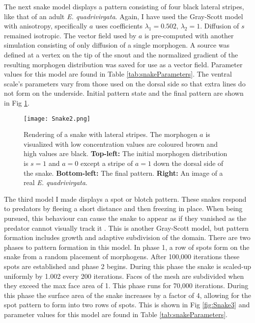 The next snake model displays a pattern consisting of four black lateral stripes, like that of an adult \textit{E. quadrivirgata}. Again, I have used the Gray-Scott model with anisotropy, specifically $a$ uses coefficients $\lambda_{1}=0.502$, $\lambda_{2}=1$. Diffusion of $s$ remained isotropic. The vector field used by $a$ is pre-computed with another simulation consisting of only diffusion of a single morphogen. A source was defined at a vertex on the tip of the snout and the normalized gradient of the resulting morphogen distribution was saved for use as a vector field. Parameter values for this model are found in Table \ref{tab:snakeParameters}. The ventral scale's parameters vary from those used on the dorsal side so that extra lines do not form on the underside. Initial pattern state and the final pattern are shown in Fig \ref{fig:Snake2}.

\begin{figure}[ht]
	\centering
	\texttt{[image: Snake2.png]}
	\caption{Rendering of a snake with lateral stripes. The morphogen $a$ is visualized with low concentration values are coloured brown and high values are black. \textbf{Top-left:} The initial morphogen distribution is $s=1$ and $a=0$ except a stripe of $a=1$ down the dorsal side of the snake. \textbf{Bottom-left:} The final pattern. \textbf{Right:} An image of a real \textit{E. quadrivirgata}.}
	\label{fig:Snake2}
\end{figure}

The third model I made displays a spot or blotch pattern. These snakes respond to predators by fleeing a short distance and then freezing in place. When being pursued, this behaviour can cause the snake to appear as if they vanished as the predator cannot visually track it \citep{lillywhite2014}. This is another Gray-Scott model, but pattern formation includes growth and adaptive subdivision of the domain. There are two phases to pattern formation in this model. In phase 1, a row of spots form on the snake from a random placement of morphogens. After 100,000 iterations these spots are established and phase 2 begins. During this phase the snake is scaled-up uniformly by 1.002 every 200 iterations. Faces of the mesh are subdivided when they exceed the max face area of 1. This phase runs for 70,000 iterations. During this phase the surface area of the snake increases by a factor of 4, allowing for the spot pattern to form into two rows of spots. This is shown in Fig \ref{fig:Snake3} and parameter values for this model are found in Table \ref{tab:snakeParameters}.

